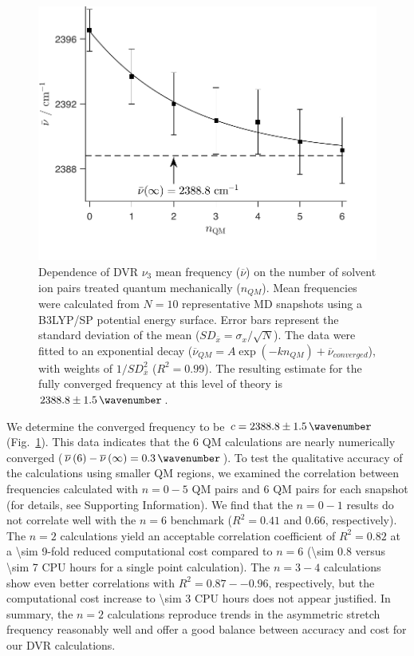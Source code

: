 \begin{figure}
  \centering
  \includegraphics{paper_02/Fig5.pdf}
  \caption[DVR convergence with respect to number of QM ion pairs]{Dependence of DVR \(\nu_{3}\) mean frequency (\(\overline{\nu}\)) on the number of solvent ion pairs treated quantum mechanically (\(n_{QM}\)). Mean frequencies were calculated from \(N = 10\) representative MD snapshots using a B3LYP/SP potential energy surface. Error bars represent the standard deviation of the mean (\(SD_{\overline{x}} = \sigma_{x}/\sqrt{N}\)). The data were fitted to an exponential decay (\({\overline{\nu}}_{QM} = A\exp\left( - kn_{QM} \right) + {\overline{\nu}}_{converged}\)), with weights of \(1/SD_{\overline{x}}^{2}\) (\(R^2 = 0.99\)). The resulting estimate for the fully converged frequency at this level of theory is \(2388.8 \pm \SI{1.5}{\wavenumber}\).}
  \label{paper_02:fig:5}
\end{figure}

We determine the converged frequency to be \(c = 2388.8 \pm \SI{1.5}{\wavenumber}\) (Fig.~\ref{paper_02:fig:5}). This data indicates that the \num{6} QM calculations are nearly numerically converged (\(\overline{\nu}\left( 6 \right) - \overline{\nu}\left( \infty \right) = \SI{0.3}{\wavenumber}\)). To test the qualitative accuracy of the calculations using smaller QM regions, we examined the correlation between frequencies calculated with \(n = 0-5\) QM pairs and \num{6} QM pairs for each snapshot (for details, see Supporting Information). We find that the \(n = 0-1\) results do not correlate well with the \(n = 6\) benchmark (\(R^{2} = 0.41\) and \num{0.66}, respectively). The \(n = 2\) calculations yield an acceptable correlation coefficient of \(R^2 = 0.82\) at a \num{\sim 9}-fold reduced computational cost compared to \(n = 6\) (\num{\sim 0.8} versus \num{\sim 7} CPU hours for a single point calculation). The \(n = 3-4\) calculations show even better correlations with \(R^2 = 0.87 -- 0.96\), respectively, but the computational cost increase to \num{\sim 3} CPU hours does not appear justified. In summary, the \(n = 2\) calculations reproduce trends in the  asymmetric stretch frequency reasonably well and offer a good balance between accuracy and cost for our DVR calculations.

